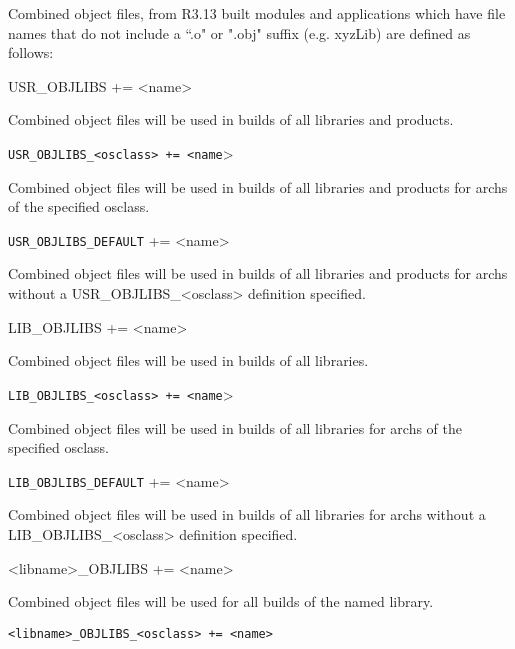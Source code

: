 \begin{description}
Combined object files, from R3.13 built modules and applications which have file names that do not include a ``.o" or 
".obj" suffix (e.g. xyzLib) are defined as follows:

\item {}USR\_OBJLIBS += \textless{}name\textgreater{}

Combined object files will be used in builds of all libraries and products.

\item \verb|USR_OBJLIBS_<osclass> += <name|\textgreater{}

Combined object files will be used in builds of all libraries and products for archs of the specified osclass.

\item \verb|USR_OBJLIBS_DEFAULT| += \textless{}name\textgreater{}

Combined object files will be used in builds of all libraries and products for archs without a 
USR\_OBJLIBS\_\textless{}osclass\textgreater{} definition specified.

\item

\item {}LIB\_OBJLIBS += \textless{}name\textgreater{}

Combined object files will be used in builds of all libraries.

\item \verb|LIB_OBJLIBS_<osclass> += <name|\textgreater{}

Combined object files will be used in builds of all libraries for archs of the specified osclass.

\item \verb|LIB_OBJLIBS_DEFAULT| += \textless{}name\textgreater{}

Combined object files will be used in builds of all libraries for archs without a LIB\_OBJLIBS\_\textless{}osclass\textgreater{} 
definition specified.

\item

\item \textless{}libname\textgreater{}\_OBJLIBS += \textless{}name\textgreater{}

Combined object files will be used for all builds of the named library.

\item \verb|<libname>_OBJLIBS_<osclass> += <name>| 


\end{description}
